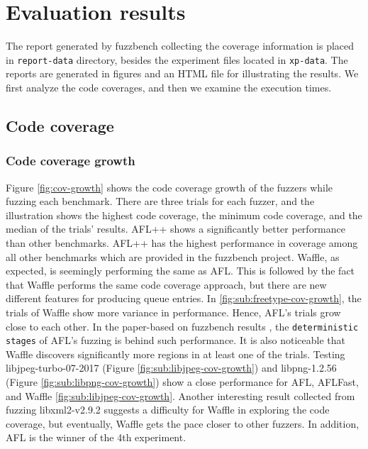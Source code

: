 \section{Evaluation results}
\label{sec:ch4-report}

The report generated by fuzzbench collecting the coverage information is placed in \texttt{report-data} directory, besides the experiment files located in \texttt{xp-data}. The reports are generated in figures and an HTML file for illustrating the results. We first analyze the code coverages, and then we examine the execution times.

\subsection{Code coverage}

\subsubsection{Code coverage growth}

Figure \ref{fig:cov-growth} shows the code coverage growth of the fuzzers while fuzzing each benchmark. There are three trials for each fuzzer, and the illustration shows the highest code coverage, the minimum code coverage, and the median of the trials' results. AFL++ shows a significantly better performance than other benchmarks. AFL++ has the highest performance in coverage among all other benchmarks which are provided in the fuzzbench project. Waffle, as expected, is seemingly performing the same as AFL. This is followed by the fact that Waffle performs the same code coverage approach, but there are new different features for producing queue entries. In \ref{fig:sub:freetype-cov-growth}, the trials of Waffle show more variance in performance. Hence, AFL's trials grow close to each other. In the paper-based on fuzzbench results \cite{metzman2021fuzzbench}, the \texttt{deterministic stages} of AFL's fuzzing is behind such performance. It is also noticeable that Waffle discovers significantly more regions in at least one of the trials. Testing libjpeg-turbo-07-2017 (Figure \ref{fig:sub:libjpeg-cov-growth}) and libpng-1.2.56 (Figure \ref{fig:sub:libpng-cov-growth}) show a close performance for AFL, AFLFast, and Waffle \ref{fig:sub:libjpeg-cov-growth}. Another interesting result collected from fuzzing libxml2-v2.9.2 suggests a difficulty for Waffle in exploring the code coverage, but eventually, Waffle gets the pace closer to other fuzzers. In addition, AFL is the winner of the 4th experiment.

